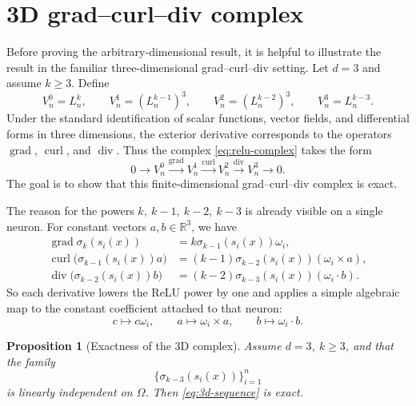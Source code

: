 \documentclass[pdflatex,sn-mathphys-num]{sn-jnl}
\newtheorem{proposition}[theorem]{Proposition}
\numberwithin{equation}{section}
\numberwithin{theorem}{section}
\numberwithin{table}{section}
\numberwithin{figure}{section}
\begin{document}
\section{3D grad--curl--div complex}\label{sec:3d}
Before proving the arbitrary-dimensional result, it is helpful to illustrate the result in the familiar three-dimensional grad–curl–div setting. Let $d=3$ and assume $k\ge 3$. Define
\begin{equation}
V_n^0=L_n^k,\qquad
V_n^1=(L_n^{k-1})^3,\qquad
V_n^2=(L_n^{k-2})^3,\qquad
V_n^3=L_n^{k-3}.
\end{equation}
Under the standard identification of scalar functions, vector fields, and
differential forms in three dimensions, the exterior derivative corresponds
to the operators $\operatorname{grad}$, $\operatorname{curl}$, and
$\operatorname{div}$. Thus the complex \eqref{eq:relu-complex} takes the
form
\begin{equation}\label{eq:3d-sequence}
0
\longrightarrow V_n^0
\xrightarrow{\operatorname{grad}} V_n^1
\xrightarrow{\operatorname{curl}} V_n^2
\xrightarrow{\operatorname{div}} V_n^3
\longrightarrow 0 .
\end{equation}
The goal is to show that this finite-dimensional grad--curl--div complex is
exact.

The reason for the powers $k,~k-1,~k-2,~k-3$ is already visible on a single neuron.
For constant vectors $a,b\in\mathbb  R^3$, we have
\begin{equation}
\begin{aligned}
    \operatorname{grad} \sigma_k(s_i(x))&=k\sigma_{k-1}(s_i(x))\omega_i,\\
\operatorname{curl}\bigl(\sigma_{k-1}(s_i(x))a\bigr)
&=(k-1)\sigma_{k-2}(s_i(x))(\omega_i\times a),\\
\operatorname{div}\bigl(\sigma_{k-2}(s_i(x))b\bigr)
&=(k-2)\sigma_{k-3}(s_i(x))(\omega_i\cdot b).
\end{aligned}
\end{equation}
So each derivative lowers the ReLU power by one and applies a simple algebraic map to the
constant coefficient attached to that neuron:
\begin{equation}
c\mapsto c\omega_i,\qquad
a\mapsto \omega_i\times a,\qquad
b\mapsto \omega_i\cdot b.
\end{equation}

\begin{proposition}[Exactness of the 3D complex]\label{prop:3d}
    Assume $d=3$, $k\ge3$, and that the family
    \begin{equation}
    \{\sigma_{k-3}(s_i(x))\}_{i=1}^n
    \end{equation}
    is linearly independent on $\Omega$.  Then \eqref{eq:3d-sequence} is exact.
\end{proposition}
\end{document}

